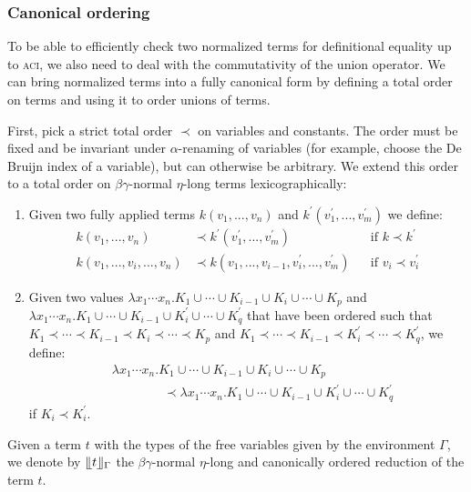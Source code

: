 \documentclass{llncs}
\newcommand{\ACIone}{\textsc{aci}\oldstylenums{1}\xspace}
\begin{document}
\subsubsection{Canonical ordering}

To be able to efficiently check two normalized terms for definitional equality up to \ACIone, we also need to deal with the commutativity of the union operator. We can bring normalized terms into a fully canonical form by defining a total order on terms and using it to order unions of terms.

First, pick a strict total order $\prec$ on variables and constants. The order must be fixed and be invariant under $\alpha$-renaming of variables (for example, choose the De Bruijn index of a variable), but can otherwise be arbitrary.
We extend this order to a total order on $\beta\gamma$-normal $\eta$-long terms lexicographically:
\begin{enumerate}
\item Given two fully applied terms $k(v_1, ..., v_n)$ and $k^\prime(v_1^\prime, ..., v_m^\prime)$ we define:
\begin{align*}
    k(v_1, ..., v_n) &\prec k^\prime(v_1^\prime, ..., v_m^\prime) && \text{if $k \prec k^\prime$} \\
    k(v_1, ..., v_i, ..., v_n) &\prec k(v_1, ..., v_{i-1},v_i^\prime, ..., v_m^\prime) &&\text{if $v_i \prec v_i^\prime$}
\end{align*}
\item Given two values $\lambda x_1\cdots x_n. K_1 \cup \cdots \cup K_{i-1} \cup K_i \cup \cdots \cup K_p$ and $\lambda x_1\cdots x_n. K_1 \cup \cdots \cup K_{i-1} \cup K_i^\prime \cup \cdots \cup K_q^\prime$ that have been ordered such that $K_1 \prec \cdots \prec K_{i-1} \prec K_i \prec \cdots \prec K_p$ and $K_1 \prec \cdots \prec K_{i-1} \prec K_i^\prime \prec \cdots \prec K_q^\prime$, we define:
\begin{align*}
    &\lambda x_1\cdots x_n. K_1 \cup \cdots \cup K_{i-1} \cup K_i \cup \cdots \cup K_p \\
    &\quad\quad\quad\quad\prec \lambda x_1\cdots x_n. K_1 \cup \cdots \cup K_{i-1} \cup K_i^\prime \cup \cdots \cup K_q^\prime
\end{align*}
if $K_i \prec K_i^\prime$.
\end{enumerate}

Given a term $t$ with the types of the free variables given by the environment $\Gamma$, we denote by $\llfloor t \rrfloor_\Gamma$ the $\beta\gamma$-normal $\eta$-long and canonically ordered reduction of the term $t$.
\end{document}
